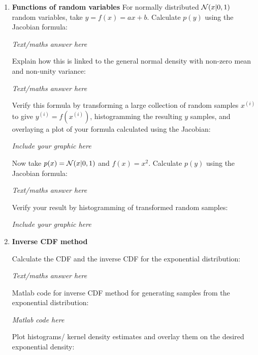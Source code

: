 \documentclass[12pt]{article}
\begin{document}
\begin{enumerate}
{\em Text/maths answer  here}
\vspace{3in}


\item {\bf Functions of random variables}
For normally distributed ${\cal N}(x|0,1)$ random variables, take $y=f(x)=ax+b$. Calculate $p(y)$ using the Jacobian formula:


{\em Text/maths answer  here}
\vspace{3in}


Explain how this is linked to the general normal density with non-zero mean and non-unity variance:


{\em Text/maths answer  here}
\vspace{3in}



 Verify this formula by transforming a large collection of random samples $x^{(i)}$ to give $y^{(i)}=f(x^{(i)})$, histogramming the resulting $y$ samples, and overlaying a plot of your formula calculated using the Jacobian:


{\em Include your graphic here}
\vspace{3in}




Now take $p(x)={\cal N}(x|0,1)$ and $f(x)=x^2$. Calculate $p(y)$ using the Jacobian formula:

{\em Text/maths answer  here}
\vspace{3in}




 Verify your result by histogramming of transformed random samples:


{\em Include your graphic here}
\vspace{3in}


\item{\bf Inverse CDF method} 



Calculate the CDF and the inverse CDF for the exponential distribution: 


{\em Text/maths answer  here}
\vspace{3in}



Matlab code for inverse CDF method for generating samples from the exponential distribution:


{\em Matlab code  here}
\vspace{3in}



Plot histograms/ kernel density estimates and overlay them on the desired exponential density:



\end{enumerate}
\end{document}
